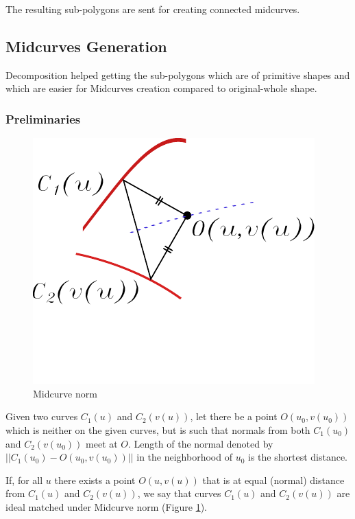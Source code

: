 The resulting sub-polygons are sent for creating connected midcurves.


\subsection{Midcurves Generation}

Decomposition helped getting the sub-polygons which are of primitive shapes and which are easier for Midcurves creation compared to original-whole shape. 


\subsubsection{Preliminaries }


\begin{figure} [h]
	\centering
	\includegraphics[scale=0.7]{..//Common/images/MidcurvesDefn.pdf}
	\vspace{-1cm}
	\caption{Midcurve norm}
	\label{figure_midcurve}
\end{figure}

Given two curves $C_1(u)$ and $C_2(v(u))$, let there be a point $O(u_0, v(u_0))$ which is neither on the given curves, but is such that normals from both $C_1(u_0)$ and  $C_2(v(u_0))$  meet at $O$. Length of the normal denoted by $||C_1(u_0) - O(u_0, v(u_0))||$ in the neighborhood of $u_0$ is the shortest distance. 

 If, for all $u$ there exists a point $O(u, v(u))$ that is at equal (normal) distance from   $C_1(u)$ and $C_2(v(u))$, we say that curves  $C_1(u)$ and $C_2(v(u))$ are ideal matched under Midcurve norm (Figure \ref{figure_midcurve})\cite{Elber1999}.


